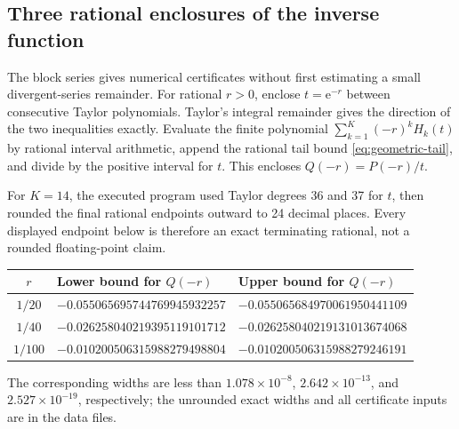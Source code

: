 \documentclass[11pt,a4paper]{article}
\numberwithin{equation}{section}
\theoremstyle{definition}
\theoremstyle{remark}
\newcommand{\ee}{\mathrm e}
\begin{document}
\subsection{Three rational enclosures of the inverse function}
The block series gives numerical certificates without first estimating a
small divergent-series remainder.  For rational $r>0$, enclose
$t=\ee^{-r}$ between consecutive Taylor polynomials.  Taylor's integral
remainder gives the direction of the two inequalities exactly.
Evaluate the finite polynomial
$\sum_{k=1}^{K}(-r)^kH_k(t)$ by rational interval arithmetic, append the
rational tail bound \eqref{eq:geometric-tail}, and divide by the positive
interval for $t$.  This encloses $Q(-r)=P(-r)/t$.

For $K=14$, the executed program used Taylor degrees 36 and 37 for $t$,
then rounded the final rational endpoints outward to 24 decimal places.
Every displayed endpoint below is therefore an exact terminating rational,
not a rounded floating-point claim.
\begin{center}\small
\begin{tabular}{@{}c l l@{}}
\toprule
$r$ & Lower bound for $Q(-r)$ & Upper bound for $Q(-r)$\\
\midrule
$1/20$ & $-0.055065695744769945932257$ & $-0.055065684970061950441109$\\
$1/40$ & $-0.026258040219395119101712$ & $-0.026258040219131013674068$\\
$1/100$ & $-0.010200506315988279498804$ & $-0.010200506315988279246191$\\
\bottomrule
\end{tabular}
\end{center}
The corresponding widths are less than $1.078\times10^{-8}$,
$2.642\times10^{-13}$, and $2.527\times10^{-19}$, respectively; the
unrounded exact widths and all certificate inputs are in the data files.
\end{document}
